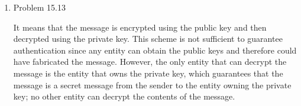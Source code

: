 \documentclass[a4paper,11pt]{article}
\theoremstyle{mytheor}
\begin{document}
\begin{enumerate}
\item{Problem 15.13} \par
    It means that the message is encrypted
using the public key and then decrypted using the private key. This
scheme is not sufficient to guarantee authentication since any entity
can obtain the public keys and therefore could have fabricated the
message. However, the only entity that can decrypt the message is the
entity that owns the private key, which guarantees that the message is
a secret message from the sender to the entity owning the private key;
no other entity can decrypt the contents of the message.
    
    
\end{enumerate}
\end{document}

